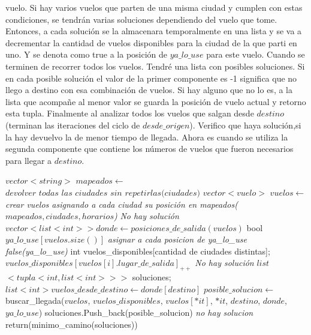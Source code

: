 \documentclass[a4paper]{article}
\begin{document}
vuelo. Si hay varios vuelos que parten de una misma ciudad y cumplen con estas condiciones, se tendrán varias soluciones dependiendo del vuelo que tome. Entonces, a cada solución se la almacenara temporalmente en una lista y se va a decrementar la cantidad de vuelos disponibles para la ciudad de la que parti en uno. Y se denota como true a la posición de $ya\_lo\_use$ para este vuelo. Cuando se terminen de recorrer todos los vuelos. Tendré una lista con posibles soluciones. Si en cada posible solución el valor de la primer componente es -1 significa que no llego a destino con esa combinación de vuelos. Si hay alguno que no lo es, a la lista que acompañe al menor valor se guarda la posición de vuelo actual y retorno esta tupla.
Finalmente al analizar todos los vuelos que salgan desde $destino$ (terminan las iteraciones del ciclo de $desde\_origen$). Verifico que haya solución,si la hay devuelvo la de menor tiempo de llegada. Ahora es cuando se utiliza la segunda componente que contiene los números de vuelos que fueron necesarios para llegar a $destino$.

\vspace{0.4cm}
\begin{algorithmic}[1]
        \State $vector<string>$ $mapeados \gets$ $\textit{devolver todas las ciudades sin repetirlas(ciudades)}$
        \State $vector<vuelo>$ $vuelos\gets$ \textit{crear vuelos asignando a cada ciudad su posición en mapeados($mapeados, ciudades, horarios$)}
        		\State \textit{No hay solución}
        	\Else 
        		\State $vector <list <int> > donde \gets posiciones\_de\_salida(vuelos)$
			\State bool $ya\_lo\_use[vuelos.size()]$ 
			\State \textit{asignar a cada posicion de ya\_lo\_use false(ya\_lo\_use)}       		
        		\State int vuelos\_disponibles[cantidad de ciudades distintas];
        			\State $vuelos\_disponibles[vuelos[i].lugar\_de\_salida]_{++}$
        		\EndFor	
        			\State \textit{No hay solución}
        		\Else	
       			\State $list$ $<tupla<int, list<int> > >$ soluciones; 
				\State $list<int> vuelos\_desde\_destino \gets donde[destino]$ 		
					\State $posible\_solucion\gets$ buscar\_llegada($vuelos$, $vuelos\_disponibles$, $vuelos[*it]$, $*it$,  $destino$, $donde$, $ya\_lo\_use$)
					\State soluciones.Push\_back(posible\_solucion)
				\EndFor
					\State \textit{no hay solucion}
				\Else
					\State return(minimo\_camino(soluciones))
				\EndIf
			\EndIf
		 \EndIf			 	
\EndProcedure
\end{algorithmic}
\end{document}
